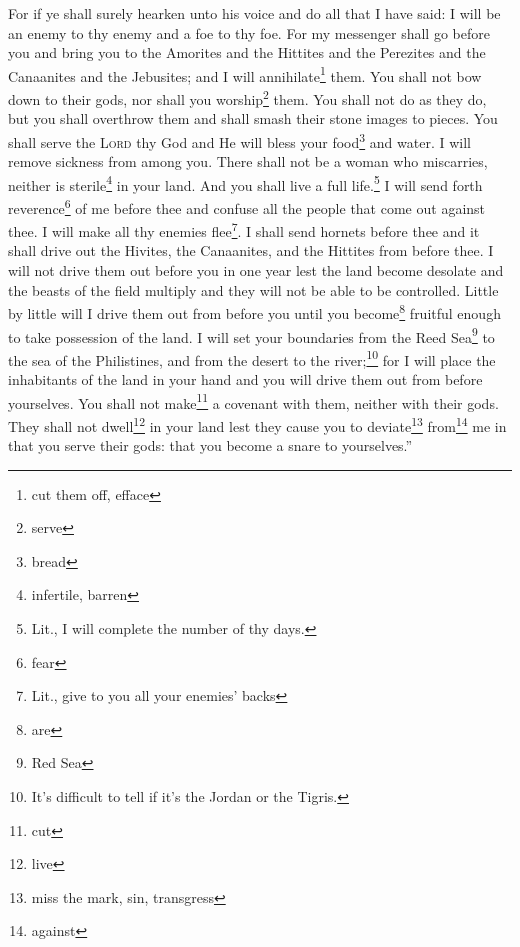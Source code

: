 \begin{enumerate}[align=center]
     For if ye shall surely hearken unto his voice and do all that I have said: I will be an enemy to thy enemy and a foe to thy foe.%
     For my messenger shall go before you and bring you to the Amorites and the Hittites and the Perezites and the Canaanites and the Jebusites; and I will annihilate\footnote{cut them off, efface} them.%
     You shall not bow down to their gods, nor shall you worship\footnote{serve} them. You shall not do as they do, but you shall overthrow them and shall smash their stone images to pieces.%
     You shall serve the \textsc{Lord} thy God and He will bless your food\footnote{bread} and water. I will remove sickness from among you.%
     There shall not be a woman who miscarries, neither is sterile\footnote{infertile, barren} in your land. And you shall live a full life.\footnote{Lit., I will complete the number of thy days.}%
     I will send forth reverence\footnote{fear} of me before thee and confuse all the people that come out against thee. I will make all thy enemies flee\footnote{Lit., give to you all your enemies' backs}.%
     I shall send hornets before thee and it shall drive out the Hivites, the Canaanites, and the Hittites from before thee.%
     I will not drive them out before you in one year lest the land become desolate and the beasts of the field multiply and they will not be able to be controlled.%
     Little by little will I drive them out from before you until you become\footnote{are} fruitful enough to take possession of the land.%
     I will set your boundaries from the Reed Sea\footnote{Red Sea} to the sea of the Philistines, and from the desert to the river;\footnote{It's difficult to tell if it's the Jordan or the Tigris.} for I will place the inhabitants of the land in your hand and you will drive them out from before yourselves.%
     You shall not make\footnote{cut} a covenant with them, neither with their gods.%
     They shall not dwell\footnote{live} in your land lest they cause you to deviate\footnote{miss the mark, sin, transgress} from\footnote{against} me in that you serve their gods: that you become a snare to yourselves.''%
\end{enumerate}
